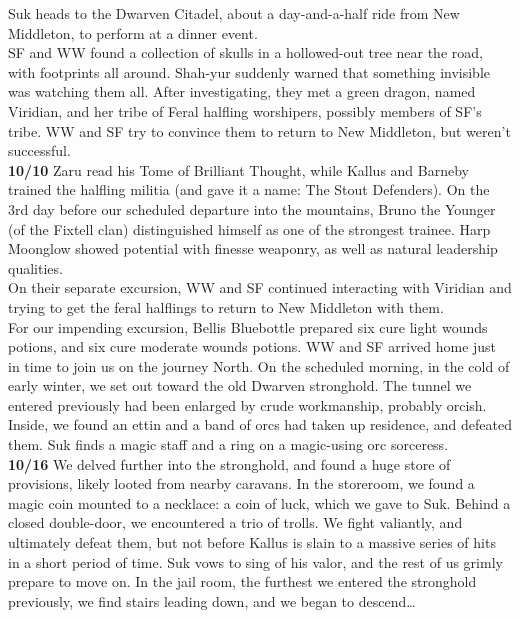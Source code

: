 \documentclass[letterpaper]{article}
\begin{document}
\noindent Suk heads to the Dwarven Citadel, about a day-and-a-half ride from New Middleton, to perform at a dinner event. \\

\noindent SF and WW found a collection of skulls in a hollowed-out tree near the road, with footprints all around.  Shah-yur suddenly warned that something invisible was watching them all.  After investigating, they met a green dragon, named Viridian, and her tribe of Feral halfling worshipers, possibly members of SF's tribe.  WW and SF try to convince them to return to New Middleton, but weren't successful. \\

\noindent \textbf{10/10} Zaru read his Tome of Brilliant Thought, while Kallus and Barneby trained the halfling militia (and gave it a name: The Stout Defenders). On the 3rd day before our scheduled departure into the mountains, Bruno the Younger (of the Fixtell clan) distinguished himself as one of the strongest trainee.  Harp Moonglow showed potential with finesse weaponry, as well as natural leadership qualities.  \\

\noindent On their separate excursion, WW and SF continued interacting with Viridian and trying to get the feral halflings to return to New Middleton with them.  \\

\noindent For our impending excursion, Bellis Bluebottle prepared six cure light wounds potions, and six cure moderate wounds potions.  WW and SF arrived home just in time to join us on the journey North.  On the scheduled morning, in the cold of early winter, we set out toward the old Dwarven stronghold.  The tunnel we entered previously had been enlarged by crude workmanship, probably orcish.  Inside, we found an ettin and a band of orcs had taken up residence, and defeated them. Suk finds a magic staff and a ring on a magic-using orc sorceress. \\

\noindent \textbf{10/16} We delved further into the stronghold, and found a huge store of provisions, likely looted from nearby caravans.  In the storeroom, we found a magic coin mounted to a necklace: a coin of luck, which we gave to Suk.  Behind a closed double-door, we encountered a trio of trolls.  We fight valiantly, and ultimately defeat them, but not before Kallus is slain to a massive series of hits in a short period of time. Suk vows to sing of his valor, and the rest of us grimly prepare to move on.  In the jail room, the furthest we entered the stronghold previously, we find stairs leading down, and we began to descend\ldots \\
\end{document}
